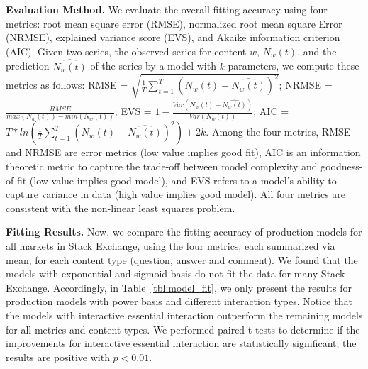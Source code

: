 \textbf{Evaluation Method.} We evaluate the overall fitting accuracy using four metrics: root mean square error (RMSE), normalized root mean square Error (NRMSE), explained variance score (EVS), and Akaike information criterion (AIC). Given two series, the observed series for content $w$, $N_w(t)$, and the prediction $\hat{N_w(t)}$ of the series by a model with $k$ parameters, we compute these metrics as follows: RMSE = $\sqrt{\frac{1}{T}\sum_{t=1}^{T}(N_w(t)-\hat{N_w(t)})^2}$; NRMSE = $\frac{RMSE}{max(N_w(t))-min(N_w(t))}$; EVS = $1-\frac{Var(N_w(t)-\hat{N_w(t)})}{Var(N_w(t))}$; AIC = $T*ln(\frac{1}{T}\sum_{t=1}^{T}(N_w(t)-\hat{N_w(t)})^2)+2k$. Among the four metrics, RMSE and NRMSE are error metrics (low value implies good fit), AIC is an information theoretic metric to capture the trade-off between model complexity and goodness-of-fit (low value implies good model), and EVS refers to a model's ability to capture variance in data (high value implies good model). All four metrics are consistent with the non-linear least squares problem. 

\textbf{Fitting Results.} Now, we compare the fitting accuracy of production models for all markets in Stack Exchange, using the four metrics, each summarized via mean, for each content type (question, answer and comment). We found that the models with exponential and sigmoid basis do not fit the data for many Stack Exchange. Accordingly, in Table~\ref{tbl:model_fit}, we only present the results for production models with power basis and different interaction types. Notice that the models with interactive essential interaction outperform the remaining models for all metrics and content types. We performed paired t-tests to determine if the improvements for interactive essential interaction are statistically significant; the results are positive with $p<0.01$.

